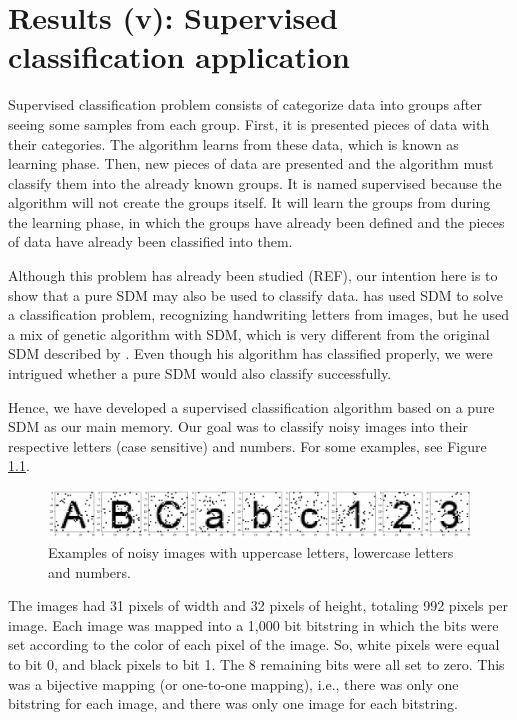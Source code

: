 
\chapter{Results (v): Supervised classification application}

Supervised classification problem consists of categorize data into groups after seeing some samples from each group. First, it is presented pieces of data with their categories. The algorithm learns from these data, which is known as learning phase. Then, new pieces of data are presented and the algorithm must classify them into the already known groups. It is named supervised because  the algorithm will not create the groups itself. It will learn the groups from during the learning phase, in which the groups have already been defined and the pieces of data have already been classified into them.

Although this problem has already been studied (REF), our intention here is to show that a pure SDM may also be used to classify data. \citet{fan1997genetic} has used SDM to solve a classification problem, recognizing handwriting letters from images, but he used a mix of genetic algorithm with SDM, which is very different from the original SDM described by \cite{Kanerva1988}. Even though his algorithm has classified properly, we were intrigued whether a pure SDM would also classify successfully.

Hence, we have developed a supervised classification algorithm based on a pure SDM as our main memory. Our goal was to classify noisy images into their respective letters (case sensitive) and numbers. For some examples, see Figure \ref{fig-classification-examples}.

\begin{figure}[!htb]
\centering\includegraphics[width=\textwidth]{./images02/classification/example.png}
\caption{Examples of noisy images with uppercase letters, lowercase letters and numbers.
\label{fig-classification-examples}}
\end{figure}

The images had 31 pixels of width and 32 pixels of height, totaling 992 pixels per image. Each image was mapped into a 1,000 bit bitstring in which the bits were set according to the color of each pixel of the image. So, white pixels were equal to bit 0, and black pixels to bit 1. The 8 remaining bits were all set to zero. This was a bijective mapping (or one-to-one mapping), i.e., there was only one bitstring for each image, and there was only one image for each bitstring.

